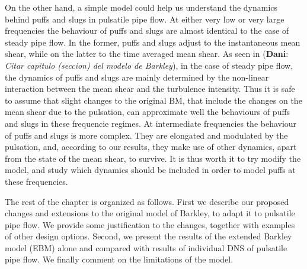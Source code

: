 \documentclass{article}
\DeclareRobustCommand{\dm}[1]{{\color{blue}(\textbf{Dani}: \textit{#1}\xspace)}}
\begin{document}
On the other hand, a simple model could help us understand the dynamics behind puffs and slugs in pulsatile pipe flow. At either very low or very large frequencies the behaviour of puffs and slugs are almost identical to the case of steady pipe flow. In the former, puffs and slugs adjust to the instantaneous mean shear, while on the latter to the time averaged mean shear. As seen in \dm{Citar capitulo (seccion) del modelo de Barkley}, in the case of steady pipe flow, the dynamics of puffs and slugs are mainly determined by the non-linear interaction between the mean shear and the turbulence intensity. Thus it is safe to assume that slight changes to the original BM, that include the changes on the mean shear due to the pulsation, can approximate well the behaviours of puffs and slugs in these frequencie regimes. At intermediate frequencies the behaviour of puffs and slugs is more complex. They are elongated and modulated by the pulsation, and, according to our results, they make use of other dynamics, apart from the state of the mean shear, to survive. It is thus worth it to try modify the model, and study which dynamics should be included in order to model puffs at these frequencies. 

The rest of the chapter is organized as follows. First we describe our proposed changes and extensions to the original model of Barkley, to adapt it to pulsatile pipe flow. We provide some justification to the changes, together with examples of other design options. Second, we present the results of the extended Barkley model (EBM) alone and compared with results of individual DNS of pulsatile pipe flow. We finally comment on the limitations of the model. 



\end{document}

